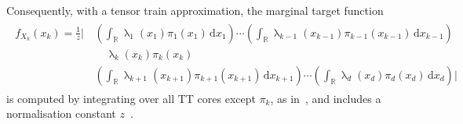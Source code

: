 Consequently, with a tensor train approximation, the marginal target function
\begin{align}
	\begin{split}
		f_{X_k}(x_k) = \frac{1}{z} \Big|\, 
		&\left( \int_{\mathbb{R}} \uplambda_1(x_1) \pi_1(x_1) \, \mathrm{d}x_1 \right) \cdots 
		\left( \int_{\mathbb{R}} \uplambda_{k-1}(x_{k-1}) \pi_{k-1}(x_{k-1}) \, \mathrm{d}x_{k-1} \right) \\
		&\quad \uplambda_k(x_k) \pi_k(x_k) \\
		& \left( \int_{\mathbb{R}} \uplambda_{k+1}(x_{k+1}) \pi_{k+1}(x_{k+1}) \, \mathrm{d}x_{k+1} \right) \cdots 
		\left( \int_{\mathbb{R}} \uplambda_d(x_d) \pi_d(x_d) \, \mathrm{d}x_d \right)
		\Big| 
	\end{split}
\end{align}
is computed by integrating over all TT cores except $\pi_k$, as in~\cite{dolgov2020approximation}, and includes a normalisation constant $z$~\cite{cui2022deep}.
\\


